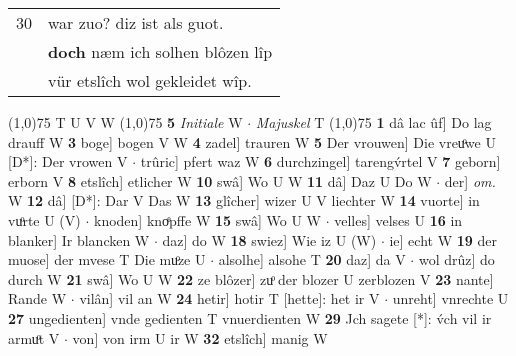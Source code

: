 \documentclass[8pt,a4paper,notitlepage]{article}
\begin{document}
\begin{table}[ht]
\begin{minipage}[t]{0.5\linewidth}
\begin{tabular}{rl}
30 & war zuo? diz ist als guot.\\ 
 & \textbf{doch} næm ich solhen blôzen lîp\\ 
 & vür etslîch wol gekleidet wîp.\\ 
\end{tabular}
\scriptsize
\line(1,0){75} \newline
T U V W \newline
\line(1,0){75} \newline
\textbf{5} \textit{Initiale} W   $\cdot$ \textit{Majuskel} T  \newline
\line(1,0){75} \newline
\textbf{1} dâ lac ûf] Do lag drauff W \textbf{3} boge] bogen V W \textbf{4} zadel] trauren W \textbf{5} Der vrouwen] Die vreuͦwe U [D*]: Der vrowen V  $\cdot$ trûric] pfert waz W \textbf{6} durchzingel] tarengv́rtel V \textbf{7} geborn] erborn V \textbf{8} etslîch] etlicher W \textbf{10} swâ] Wo U W \textbf{11} dâ] Daz U Do W  $\cdot$ der] \textit{om.} W \textbf{12} dâ] [D*]: Dar V Das W \textbf{13} glîcher] wizer U V liechter W \textbf{14} vuorte] in vuͦrte U (V)  $\cdot$ knoden] knoͤpffe W \textbf{15} swâ] Wo U W  $\cdot$ velles] velses U \textbf{16} in blanker] Ir blancken W  $\cdot$ daz] do W \textbf{18} swiez] Wie iz U (W)  $\cdot$ ie] echt W \textbf{19} der muose] der mvese T Die muͦze U  $\cdot$ alsolhe] alsohe T \textbf{20} daz] da V  $\cdot$ wol drûz] do durch W \textbf{21} swâ] Wo U W \textbf{22} ze blôzer] zuͦ der blozer U zerblozen V \textbf{23} nante] Rande W  $\cdot$ vilân] vil an W \textbf{24} hetir] hotir T [hette]: het ir V  $\cdot$ unreht] vnrechte U \textbf{27} ungedienten] vnde gedienten T vnuerdienten W \textbf{29} Jch sagete [*]: v́ch vil ir armuͦt V  $\cdot$ von] von irm U ir W \textbf{32} etslîch] manig W \newline
\end{minipage}
\end{table}
\end{document}
